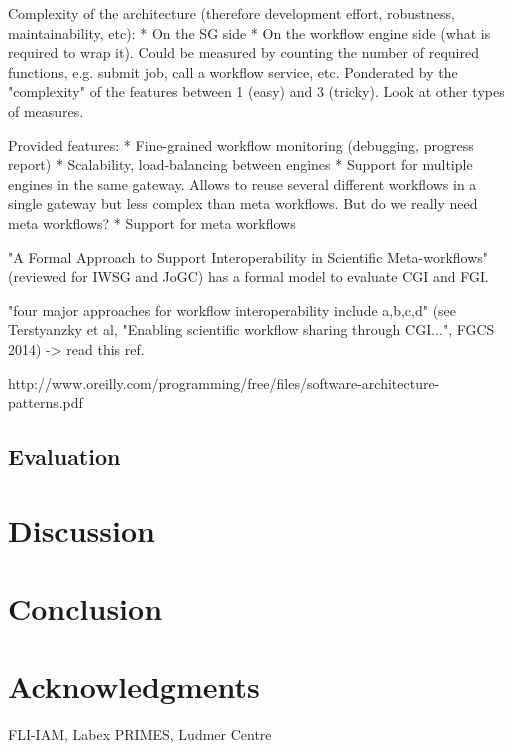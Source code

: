 \documentclass[11pt]{article}
\begin{document}
Complexity of the architecture (therefore development effort, robustness, maintainability, etc):
  * On the SG side
  * On the workflow engine side (what is required to wrap it).
Could be measured by counting the number of required functions,
e.g. submit job, call a workflow service, etc. Ponderated by the
"complexity" of the features between 1 (easy) and 3 (tricky). Look at
other types of measures.

Provided features:
  * Fine-grained workflow monitoring (debugging, progress report)
  * Scalability, load-balancing between engines
  * Support for multiple engines in the same gateway. Allows to reuse several different workflows in a single gateway but less complex than meta workflows. But do we really need meta workflows?
  * Support for meta workflows

"A Formal Approach to Support Interoperability in Scientific
Meta-workflows" (reviewed for IWSG and JoGC) has a formal model to
evaluate CGI and FGI.

"four major approaches for workflow interoperability include a,b,c,d" (see Terstyanzky et al, "Enabling scientific workflow sharing through CGI...", FGCS 2014) -> read this ref.

http://www.oreilly.com/programming/free/files/software-architecture-patterns.pdf

\subsection{Evaluation}

\section{Discussion}

\section{Conclusion}

\section{Acknowledgments}

FLI-IAM, Labex PRIMES, Ludmer Centre

 

\end{document}
